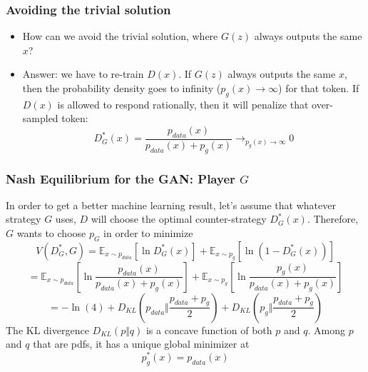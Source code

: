 \documentclass{beamer}
\begin{document}
\begin{frame}
  \frametitle{Avoiding the trivial solution}

  \begin{itemize}
  \item How can we avoid the trivial solution, where $G(z)$ always
    outputs the same $x$?
  \item Answer: we have to re-train $D(x)$.  If $G(z)$ always outputs
    the same $x$, then the probability density goes to infinity
    ($p_g(x)\rightarrow\infty$) for that token.  If $D(x)$ is allowed
    to respond rationally, then it will penalize that over-sampled
    token:
    \begin{displaymath}
      D^*_G(x) = \frac{p_{data}(x)}{p_{data}(x)+p_g(x)} \rightarrow_{p_g(x)\rightarrow\infty} 0
    \end{displaymath}
  \end{itemize}
\end{frame}

  
\begin{frame}
  \frametitle{Nash Equilibrium for the GAN: Player $G$}

  In order to get a better machine learning result, let's assume that
  whatever strategy $G$ uses, $D$ will choose the optimal
  counter-strategy $D_G^*(x)$.  Therefore, $G$ wants to choose $p_G$
  in order to minimize
  \begin{displaymath}
    V(D^*_G,G) = \mathbb{E}_{x\sim p_{data}}\left[\ln D_G^*(x)\right]
    +\mathbb{E}_{x\sim p_g}\left[\ln\left(1-D_G^*(x)\right)\right]
  \end{displaymath}
  \begin{displaymath}
    = \mathbb{E}_{x\sim p_{data}}\left[\ln\frac{p_{data}(x)}{p_{data}(x)+p_g(x)}\right]
    +\mathbb{E}_{x\sim p_g}\left[\ln\frac{p_g(x)}{p_{data}(x)+p_g(x)}\right]
  \end{displaymath}
  \begin{displaymath}
    = -\ln(4)+D_{KL}\left(p_{data}\Vert\frac{p_{data}+p_g}{2}\right)+
    D_{KL}\left(p_g\Vert\frac{p_{data}+p_g}{2}\right)
  \end{displaymath}
  The KL divergence $D_{KL}(p\Vert q)$ is a concave function of both $p$ and $q$.
  Among $p$ and $q$ that are pdfs, it has  a unique global minimizer at
  \begin{displaymath}
    p_g^*(x) = p_{data}(x)
  \end{displaymath}
\end{frame}
  
\end{document}
